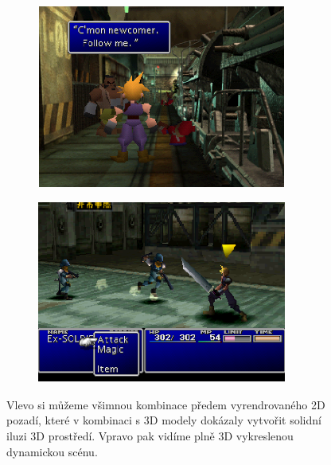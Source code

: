 \begin{figure}[hbt]
    \begin{subfigure}{0.5\textwidth}
        \centering
        \includegraphics[width=0.9\textwidth, height=6cm]{obrazky-figures/ff7-showcase-1-1.png}
    \end{subfigure}
    \begin{subfigure}{0.5\textwidth}
        \centering
        \includegraphics[width=0.9\textwidth, height=6cm]{obrazky-figures/ff7-showcase-1-2.png}
    \end{subfigure}
    \caption[Test hry \textit{Final Fantasy VII}]{Vlevo si můžeme všimnou kombinace předem vyrendrovaného 2D pozadí, které v kombinaci s 3D modely dokázaly vytvořit solidní iluzi 3D prostředí. Vpravo pak
             vidíme plně 3D vykreslenou dynamickou scénu.}
    \label{ff7-showcase-1}
\end{figure}

